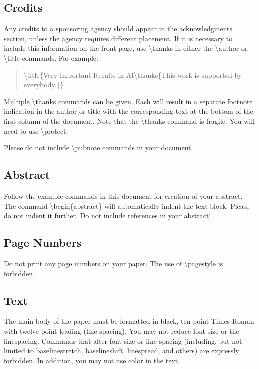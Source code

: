 \subsection{Credits}
Any credits to a sponsoring agency should appear in the acknowledgments section, unless the agency requires different placement. If it is necessary to include this information on the front page, use
\textbackslash thanks in either the \textbackslash author or \textbackslash title commands.
For example:
\begin{quote}
\begin{small}
\textbackslash title\{Very Important Results in AI\textbackslash thanks\{This work is
 supported by everybody.\}\}
\end{small}
\end{quote}
Multiple \textbackslash thanks commands can be given. Each will result in a separate footnote indication in the author or title with the corresponding text at the bottom of the first column of the document. Note that the \textbackslash thanks command is fragile. You will need to use \textbackslash protect.

Please do not include \textbackslash pubnote commands in your document.

\subsection{Abstract}
Follow the example commands in this document for creation of your abstract. The command \textbackslash begin\{abstract\} will automatically indent the text block. Please do not indent it further. {Do not include references in your abstract!}

\subsection{Page Numbers}

Do not print any page numbers on your paper. The use of \textbackslash pagestyle is forbidden.

\subsection{Text}
The main body of the paper must be formatted in black, ten-point Times Roman with twelve-point leading (line spacing). You may not reduce font size or the linespacing. Commands that alter font size or line spacing (including, but not limited to baselinestretch, baselineshift, linespread, and others) are expressly forbidden. In addition, you may not use color in the text.

